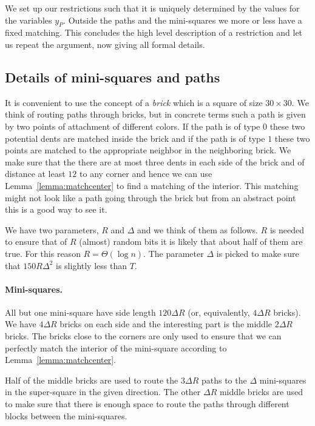 \documentclass{article}\usepackage[a4paper,margin=20mm]{geometry}
\begin{document}
We set up our restrictions such that it is uniquely
determined by the values for the variables $y_P$.
Outside the paths and
the mini-squares we more or less have a fixed matching.
This concludes the high level description of
a restriction and let us repeat the argument, now giving all
formal details.

\subsection{Details of mini-squares and paths}

It is convenient to
use the concept of a {\em brick} which is a square of size
$30 \times 30$.  We think of routing paths
through bricks, but in concrete terms such a path
is given by two points of attachment of different colors.
If the path is of type $0$ these two potential dents
are matched inside the brick and if the path is of type
$1$ these two points are matched to the appropriate neighbor
in the neighboring brick.   We make sure that the 
there are at most three dents in each side of the brick and
of distance at least $12$ to any corner and hence we can
use Lemma~\ref{lemma:matchcenter} to find a matching
of the interior.  This matching might not look like
a path going through the brick but from an abstract point
this is a good way to see it.

We have two parameters, $R$ and $\Delta$ and we
think of them as follows.  $R$ is needed to ensure
that of $R$ (almost) random bits it is likely that
about half of them are true.  For this reason $R=\Theta (\log n)$.
The parameter $\Delta$ is picked to make sure that 
$150 R \Delta^2$ is slightly less than $T$.

\paragraph{Mini-squares.} All but one mini-square have side length $120 \Delta R$
(or, equivalently, $4 \Delta R$ bricks).
We have $4\Delta R$ bricks on each side and 
the interesting part is the middle $2\Delta R$ bricks.
The bricks close to the corners are only used to 
ensure that we can perfectly match the interior of the
mini-square according to Lemma~\ref{lemma:matchcenter}.

Half of the middle bricks are used to route the $3\Delta R$ paths
to the $\Delta$ mini-squares in the super-square in the
given direction.  The other $\Delta R$ middle bricks
are used to make sure that there is enough space to
route the paths through different blocks between
the mini-squares.  
\end{document}
